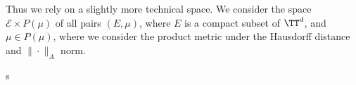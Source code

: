 Thus we rely on a slightly more technical space. We consider the space $\mathcal{E} \times P(\mu)$ of all pairs $(E,\mu)$, where $E$ is a compact subset of $\TT^d$, and $\mu \in P(\mu)$, where we consider the product metric under the Hausdorff distance and $\| \cdot \|_A$ norm.

\begin{theorem}
	s
\end{theorem}




